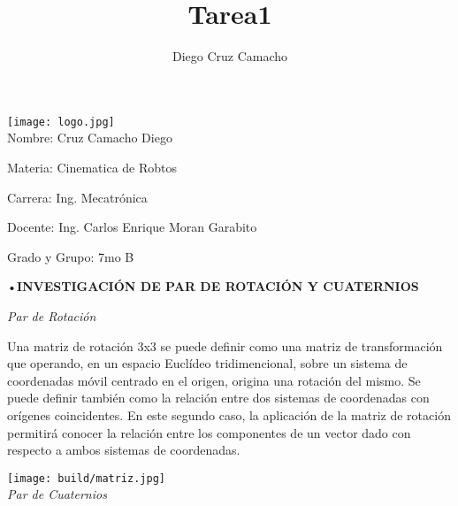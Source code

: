 \documentclass[12pt,letterpaper]{article}
\author{Diego Cruz Camacho}
\title{Tarea1}
\begin{document}
\maketitle
\begin{center}
\texttt{[image: logo.jpg]}\\

Nombre: Cruz Camacho Diego

Materia: Cinematica de Robtos

Carrera: Ing. Mecatrónica

Docente: Ing. Carlos Enrique Moran Garabito

Grado y Grupo: 7mo B\\           

\end{center}

\begin{center}
•\textbf{INVESTIGACIÓN DE PAR DE ROTACIÓN Y CUATERNIOS}\\
\end{center}

\begin{center}
\textit{Par de Rotación}\\
\end{center}

\begin{flushleft}

Una matriz de rotación 3x3 se puede definir como una matriz de transformación que operando, en un espacio Euclídeo tridimencional, sobre un sistema de coordenadas móvil centrado en el origen, origina una rotación del mismo. Se puede definir también como la relación entre dos sistemas de coordenadas con orígenes coincidentes. En este segundo caso, la aplicación de la matriz de rotación permitirá conocer la relación entre los componentes de un vector dado con respecto a ambos sistemas de coordenadas.
\end{flushleft}
\begin{center}

\texttt{[image: build/matriz.jpg]}\\  


\textit{Par de Cuaternios}\\
\end{center}
\end{document}
